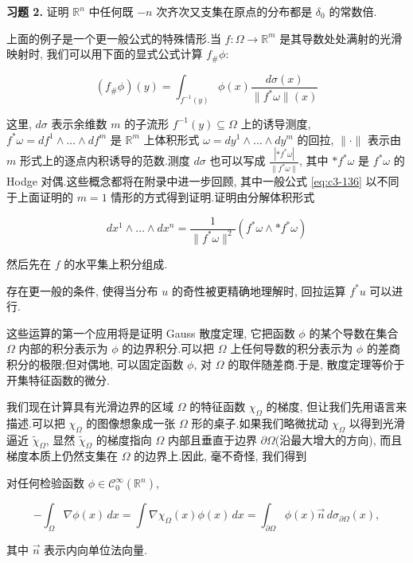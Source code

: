 \textbf{习题 2.} 证明 $\mathbb{R}^n$ 中任何既 $-n$ 次齐次又支集在原点的分布都是 $\delta_0$ 的常数倍.

上面的例子是一个更一般公式的特殊情形.当 $f : \Omega\to\mathbb{R}^m$ 是其导数处处满射的光滑映射时, 我们可以用下面的显式公式计算 $f_{\#}\phi$:

\begin{equation}
(f_{\#}\phi)(y) = \int_{f^{-1}(y)}\phi(x)\frac{d\sigma(x)}{\|f^*\omega\|(x)}\label{eq:c3-136}
\end{equation}

这里, $d\sigma$ 表示余维数 $m$ 的子流形 $f^{-1}(y)\subseteq\Omega$ 上的诱导测度, $f^*\omega = df^1\wedge\ldots\wedge df^m$ 是 $\mathbb{R}^m$ 上体积形式 $\omega = dy^1\wedge\ldots\wedge dy^m$ 的回拉, $\|\cdot\|$ 表示由 $m$ 形式上的逐点内积诱导的范数.测度 $d\sigma$ 也可以写成 $\frac{|*f^*\omega|}{\|f^*\omega\|}$, 其中 $*f^*\omega$ 是 $f^*\omega$ 的 Hodge 对偶.这些概念都将在附录中进一步回顾, 其中一般公式 \eqref{eq:c3-136} 以不同于上面证明的 $m=1$ 情形的方式得到证明.证明由分解体积形式

\[
dx^1\wedge\ldots\wedge dx^n = \frac{1}{\|f^*\omega\|^2}(f^*\omega\wedge*f^*\omega)
\]

然后先在 $f$ 的水平集上积分组成.

存在更一般的条件, 使得当分布 $u$ 的奇性被更精确地理解时, 回拉运算 $f^*u$ 可以进行.


这些运算的第一个应用将是证明 Gauss 散度定理, 它把函数 $\phi$ 的某个导数在集合 $\Omega$ 内部的积分表示为 $\phi$ 的边界积分.可以把 $\Omega$ 上任何导数的积分表示为 $\phi$ 的差商积分的极限;但对偶地, 可以固定函数 $\phi$, 对 $\Omega$ 的取伴随差商.于是, 散度定理等价于开集特征函数的微分.

我们现在计算具有光滑边界的区域 $\Omega$ 的特征函数 $\chi_{\Omega}$ 的梯度, 但让我们先用语言来描述.可以把 $\chi_{\Omega}$ 的图像想象成一张 $\Omega$ 形的桌子.如果我们略微扰动 $\chi_{\Omega}$ 以得到光滑逼近 $\tilde{\chi}_{\Omega}$, 显然 $\tilde{\chi}_{\Omega}$ 的梯度指向 $\Omega$ 内部且垂直于边界 $\partial\Omega$(沿最大增大的方向), 而且梯度本质上仍然支集在 $\Omega$ 的边界上.因此, 毫不奇怪, 我们得到

\begin{proposition}\label{prop:c3-4.1}
对任何检验函数 $\phi\in\mathcal{C}_0^{\infty}(\mathbb{R}^n)$,

\[
-\int_{\Omega}\nabla\phi(x)\, dx = \int\nabla\chi_{\Omega}(x)\phi(x)\, dx = \int_{\partial\Omega}\phi(x)\vec{n}\, d\sigma_{\partial\Omega}(x),
\]

其中 $\vec{n}$ 表示内向单位法向量.
\end{proposition}

